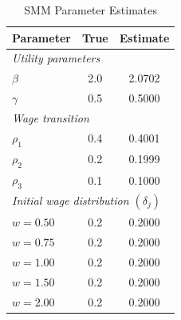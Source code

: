 \begin{table}[htbp]
\centering
\caption{SMM Parameter Estimates}
\begin{tabular}{lcc}
\toprule
Parameter & True & Estimate \\
\midrule
\multicolumn{3}{l}{\textit{Utility parameters}} \\
\quad $\beta$                  & 2.0 & 2.0702 \\
\quad $\gamma$                 & 0.5 & 0.5000 \\
\midrule
\multicolumn{3}{l}{\textit{Wage transition}} \\
\quad $\rho_1$                 & 0.4 & 0.4001 \\
\quad $\rho_2$                 & 0.2 & 0.1999 \\
\quad $\rho_3$                 & 0.1 & 0.1000 \\
\midrule
\multicolumn{3}{l}{\textit{Initial wage distribution $(\delta_j)$}} \\
\quad $w = 0.50$               & 0.2 & 0.2000 \\
\quad $w = 0.75$               & 0.2 & 0.2000 \\
\quad $w = 1.00$               & 0.2 & 0.2000 \\
\quad $w = 1.50$               & 0.2 & 0.2000 \\
\quad $w = 2.00$               & 0.2 & 0.2000 \\
\bottomrule
\end{tabular}
\end{table}
